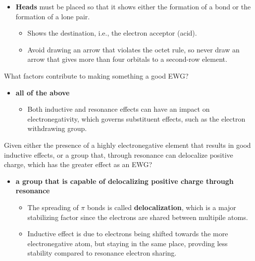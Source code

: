 \documentclass[12pt,a4paper]{article}
\begin{document}
\begin{enumerate}
\begin{itemize}
\begin{itemize}
\begin{itemize}
                    \end{itemize}
                \item \textbf{Heads} must be placed so that it shows either the formation of a bond or the formation of a lone pair.
                    \begin{itemize}
                        \item Shows the {\color{o-Sun}destination}, i.e., the electron acceptor (acid).
                        \item Avoid drawing an arrow that violates the octet rule, so never draw an arrow that gives more than four orbitals to a second-row element.
                    \end{itemize}
                \end{itemize}
        \end{itemize}
    {\color{G-Moon}\item What factors contribute to making something a good EWG?}
        \begin{itemize}
            \item {\color{o-Sun}\textbf{all of the above}}
                \begin{itemize}
                    \item Both inductive and resonance effects can have an impact on electronegativity, which governs substituent effects, such as the electron withdrawing group.
                \end{itemize}
        \end{itemize}
    {\color{G-Moon}\item Given either the presence of a highly electronegative element that results in good inductive effects, or a group that, through resonance can delocalize positive charge, which has the greater effect as an EWG?}
        \begin{itemize}
            \item {\color{o-Sun}\textbf{a group that is capable of delocalizing positive charge through resonance}}
                \begin{itemize}
                    \item The spreading of $\pi$ bonds is called \textbf{delocalization}, {\color{o-Sun}which is a major stabilizing factor} since the electrons are shared between multipile atoms.
                    \item Inductive effect is due to electrons being shifted towards the more electronegative atom, but staying in the same place, provding less stability compared to resonance electron sharing.

\end{itemize}
\end{itemize}
\end{enumerate}
\end{document}
